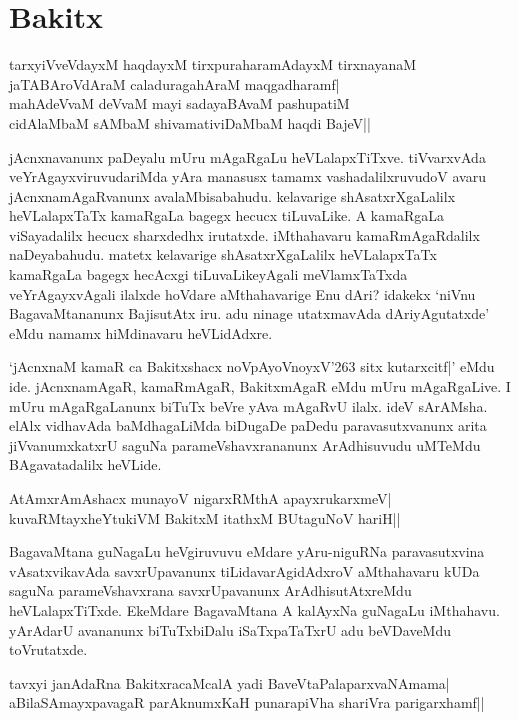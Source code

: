 \chapter{Bakitx}\label{chap2}

\begin{shloka}
tarxyiVveVdayxM haqdayxM tirxpuraharamAdayxM tirxnayanaM\\
jaTABAroVdAraM caladuragahAraM maqgadharamf|\\
mahAdeVvaM deVvaM mayi sadayaBAvaM pashupatiM\\
cidAlaMbaM sAMbaM shivamativiDaMbaM haqdi BajeV||
\end{shloka}

jAcnxnavanunx paDeyalu mUru mAgaRgaLu heVLalapxTiTxve. tiVvarxvAda veYrAgayxviruvudariMda yAra manasusx tamamx vashadalilxruvudoV 
avaru jAcnxnamAgaRvanunx avalaMbisabahudu. kelavarige shAsatxrXgaLalilx heVLalapxTaTx kamaRgaLa bagegx hecucx tiLuvaLike. A kamaRgaLa 
viSayadalilx hecucx sharxdedhx irutatxde. iMthahavaru kamaRmAgaRdalilx naDeyabahudu. matetx kelavarige shAsatxrXgaLalilx heVLalapxTaTx kamaRgaLa bagegx hecAcxgi 
tiLuvaLikeyAgali meVlamxTaTxda veYrAgayxvAgali ilalxde hoVdare aMthahavarige Enu dAri? idakekx `niVnu BagavaMtananunx BajisutAtx iru. adu ninage 
utatxmavAda dAriyAgutatxde' eMdu namamx hiMdinavaru heVLidAdxre.

`jAcnxnaM kamaR ca Bakitxshacx noVpAyoVnoyxV\char'263 sitx kutarxcitf|' eMdu ide. jAcnxnamAgaR, kamaRmAgaR, BakitxmAgaR eMdu mUru 
mAgaRgaLive. I mUru mAgaRgaLanunx biTuTx beVre yAva mAgaRvU ilalx. ideV sArAMsha. elAlx vidhavAda baMdhagaLiMda biDugaDe paDedu 
paravasutxvanunx arita jiVvanumxkatxrU saguNa parameVshavxrananunx ArAdhisuvudu uMTeMdu BAgavatadalilx heVLide.

\begin{shloka}
AtAmxrAmAshacx munayoV nigarxRMthA apayxrukarxmeV|\\
kuvaRMtayxheYtukiVM BakitxM itathxM BUtaguNoV hariH||
\end{shloka}

BagavaMtana guNagaLu heVgiruvuvu eMdare yAru-niguRNa paravasutxvina vAsatxvikavAda savxrUpavanunx tiLidavarAgidAdxroV aMthahavaru 
kUDa saguNa parameVshavxrana savxrUpavanunx ArAdhisutAtxreMdu heVLalapxTiTxde. EkeMdare BagavaMtana A kalAyxNa guNagaLu 
iMthahavu. yArAdarU avananunx biTuTxbiDalu iSaTxpaTaTxrU adu beVDaveMdu toVrutatxde.

\begin{shloka}
tavxyi janAdaRna BakitxracaMcalA yadi BaveVtaPalaparxvaNAmama|\\
aBilaSAmayxpavagaR parAknumxKaH punarapiVha shariVra parigarxhamf||
\end{shloka}

